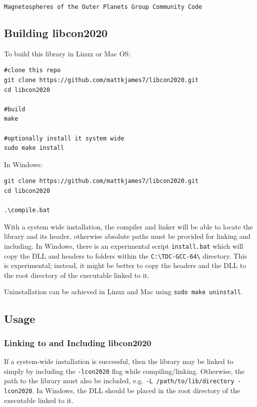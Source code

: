 	\texttt{Magnetospheres of the Outer Planets Group Community Code}
	
	\subsection{Building libcon2020}
	
	To build this library in Linux or Mac OS:
	
	\begin{verbatim}
#clone this repo
git clone https://github.com/mattkjames7/libcon2020.git
cd libcon2020
	
#build
make
	
#optionally install it system wide
sudo make install
	\end{verbatim}
	
	In Windows:
	
	\begin{verbatim}
git clone https://github.com/mattkjames7/libcon2020.git
cd libcon2020
	
.\compile.bat
	\end{verbatim}
	
	With a system wide installation, the compiler and linker will be able to locate the library and its header, otherwise absolute paths must be provided for linking and including. In Windows, there is an experimental script \texttt{install.bat} which will copy the DLL and headers to folders within the \texttt{C:\textbackslash TDC-GCC-64\textbackslash} directory. This is experimental; instead, it might be better to copy the headers and the DLL to the root directory of the executable linked to it.
	
	Uninstallation can be achieved in Linux and Mac using \texttt{sudo make uninstall}.
	
	\subsection{Usage}
	
	\subsubsection{Linking to and Including libcon2020}
	
	If a system-wide installation is successful, then the library may be linked to simply by including the \texttt{-lcon2020} flag while compiling/linking. Otherwise, the path to the library must also be included, e.g. \texttt{-L /path/to/lib/directory -lcon2020}. In Windows, the DLL should be placed in the root directory of the executable linked to it.
	
